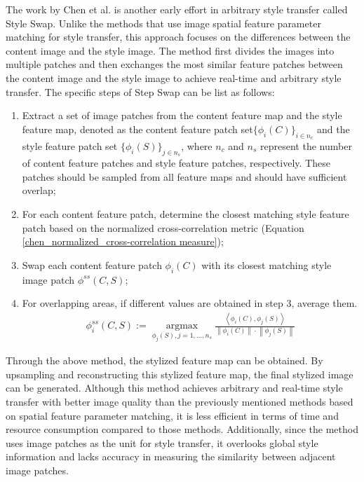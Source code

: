 The work by Chen et al.\citep{43chen2016fast} is another early effort in arbitrary style transfer called Style Swap. Unlike the methods\citep{04huang2017arbitrary,39dumoulin2016learned,41jing2020dynamic} that use image spatial feature parameter matching for style transfer, this approach focuses on the differences between the content image and the style image. The method first divides the images into multiple patches and then exchanges the most similar feature patches between the content image and the style image to achieve real-time and arbitrary style transfer. The specific steps of Step Swap can be list as follows: 
\begin{enumerate}
    \item  Extract a set of image patches from the content feature map and the style feature map, denoted as the content feature patch set$\{\phi_i(C)\}_{i\in n_c}$ and the style feature patch set $\{\phi_i(S)\}_{j\in n_s}$, where $n_c$ and $n_s$ represent the number of content feature patches and style feature patches, respectively. These patches should be sampled from all feature maps and should have sufficient overlap;
    \item  For each content feature patch, determine the closest matching style feature patch based on the normalized cross-correlation metric (Equation \ref{chen_normalized_cross-correlation measure});
    \item Swap each content feature patch $\phi_i(C)$ with its closest matching style image patch $\phi^{ss}(C,S)$;
    \item   For overlapping areas, if different values are obtained in step 3, average them.
    \begin{equation}
        \begin{aligned}
            \label{chen_normalized_cross-correlation measure}
            \phi_{i}^{s s}(C, S):=\underset{\phi_{j}(S), j=1, \ldots, n_{s}}{\operatorname{argmax}} \frac{\left\langle\phi_{i}(C), \phi_{j}(S)\right\rangle}{\left\|\phi_{i}(C)\right\| \cdot\left\|\phi_{j}(S)\right\|}
        \end{aligned}
    \end{equation}
\end{enumerate}

Through the above method, the stylized feature map can be obtained. By upsampling and reconstructing this stylized feature map, the final stylized image can be generated. Although this method achieves arbitrary and real-time style transfer with better image quality than the previously mentioned methods based on spatial feature parameter matching\citep{04huang2017arbitrary,39dumoulin2016learned,41jing2020dynamic}, it is less efficient in terms of time and resource consumption compared to those methods. Additionally, since the method uses image patches as the unit for style transfer, it overlooks global style information and lacks accuracy in measuring the similarity between adjacent image patches.

